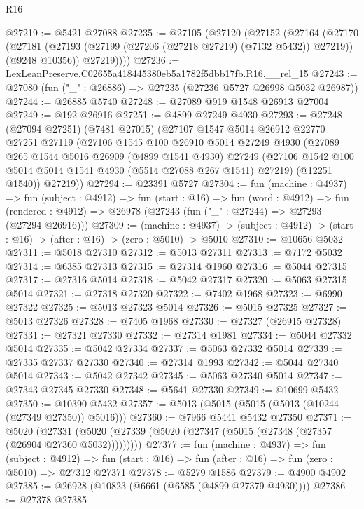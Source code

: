 \begin{lexlean}{R16}
\begin{coremodule}
@27219 := @5421 @27088
@27235 := @27105
    (@27120
      (@27152
        (@27164
          (@27170
            (@27181 (@27193 (@27199 (@27206 (@27218 @27219) (@7132 @5432)) @27219)) (@9248 @10356))
            @27219))))
@27236 := LexLeanPreserve.C02655a418445380eb5a1782f5dbb17fb.R16.__rel_15
@27243 := @27080 (fun ("_" : @26886) => @27235 (@27236 @5727 @26998 @5032 @26987))
@27244 := @26885 @5740
@27248 := @27089 @919 @1548 @26913 @27004
@27249 := @192 @26916
@27251 := @4899 @27249 @4930
@27293 := @27248
    (@27094 @27251)
    (@7481 @27015)
    (@27107
      @1547
      @5014
      @26912
      @22770
      @27251
      @27119
      (@27106
        @1545
        @100
        @26910
        @5014
        @27249
        @4930
        (@27089
          @265
          @1544
          @5016
          @26909
          (@4899 @1541 @4930)
          @27249
          (@27106 @1542 @100 @5014 @5014 @1541 @4930 (@5514 @27088 @267 @1541) @27219)
          (@12251 @1540))
        @27219))
@27294 := @23391 @5727
@27304 := fun (machine : @4937) =>
  fun (subject : @4912) =>
  fun (start : @16) =>
  fun (word : @4912) =>
  fun (rendered : @4912) => @26978 (@27243 (fun ("_" : @27244) => @27293 (@27294 @26916)))
@27309 := (machine : @4937) ->
  (subject : @4912) -> (start : @16) -> (after : @16) -> (zero : @5010) -> @5010
@27310 := @10656 @5032
@27311 := @5018 @27310
@27312 := @5013 @27311
@27313 := @7172 @5032
@27314 := @6385 @27313
@27315 := @27314 @1960
@27316 := @5044 @27315
@27317 := @27316 @5014
@27318 := @5042 @27317
@27320 := @5063 @27315 @5014
@27321 := @27318 @27320
@27322 := @7402 @1968
@27323 := @6990 @27322
@27325 := @5013 @27323 @5014
@27326 := @5015 @27325
@27327 := @5013 @27326
@27328 := @7405 @1968
@27330 := @27327 (@26915 @27328)
@27331 := @27321 @27330
@27332 := @27314 @1981
@27334 := @5044 @27332 @5014
@27335 := @5042 @27334
@27337 := @5063 @27332 @5014
@27339 := @27335 @27337 @27330
@27340 := @27314 @1993
@27342 := @5044 @27340 @5014
@27343 := @5042 @27342
@27345 := @5063 @27340 @5014
@27347 := @27343 @27345 @27330
@27348 := @5641 @27330
@27349 := @10699 @5432
@27350 := @10390 @5432
@27357 := @5013 (@5015 (@5015 (@5013 (@10244 (@27349 @27350)) @5016)))
@27360 := @7966 @5441 @5432 @27350
@27371 := @5020
    (@27331 (@5020 (@27339 (@5020 (@27347 (@5015 (@27348 (@27357 (@26904 @27360 @5032)))))))))
@27377 := fun (machine : @4937) =>
  fun (subject : @4912) =>
  fun (start : @16) => fun (after : @16) => fun (zero : @5010) => @27312 @27371
@27378 := @5279 @1586
@27379 := @4900 @4902
@27385 := @26928 (@10823 (@6661 (@6585 (@4899 @27379 @4930))))
@27386 := @27378 @27385

\end{coremodule}
\end{lexlean}
